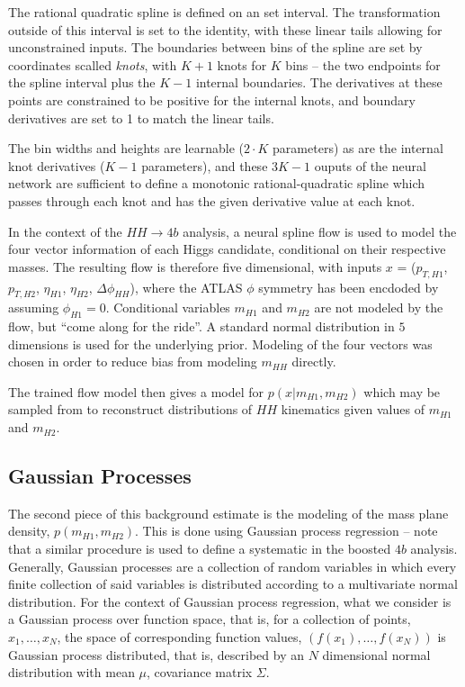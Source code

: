 The rational quadratic spline is defined on an set interval. The transformation outside of this interval 
is set to the identity, with these linear tails allowing for unconstrained inputs. The boundaries between 
bins of the spline are set by coordinates scalled \emph{knots}, with $K+1$ knots for $K$ bins -- the two 
endpoints for the spline interval plus the $K-1$ internal boundaries. The derivatives 
at these points are constrained to be positive for the internal knots, and boundary 
derivatives are set to 1 to match the linear tails. 

The bin widths and heights are learnable ($2\cdot K$ parameters) as are the internal knot derivatives
($K-1$ parameters), and these $3K-1$ ouputs of the neural network are sufficient to define a monotonic 
rational-quadratic spline which passes through each knot and has the given derivative value at each knot.

In the context of the $HH\rightarrow 4b$ analysis, a neural spline flow is used to model the four vector 
information of each Higgs candidate, conditional on their respective masses. The resulting flow is 
therefore five dimensional, with inputs $x$ = ($p_{T, H1}$, $p_{T, H2}$, $\eta_{H1}$, $\eta_{H2}$, 
$\Delta\phi_{HH}$), where the ATLAS $\phi$ symmetry has been encdoded by assuming $\phi_{H1} = 0$. 
Conditional variables $m_{H1}$ and $m_{H2}$ are not modeled by the flow, but ``come along for the ride''. 
A standard normal distribution in $5$ dimensions is used for the underlying prior. Modeling of the four 
vectors was chosen in order to reduce bias from modeling $m_{HH}$ directly.

The trained flow model then gives a model for $p(x|m_{H1}, m_{H2})$ which may be sampled from to reconstruct 
distributions of $HH$ kinematics given values of $m_{H1}$ and $m_{H2}$.

\subsection{Gaussian Processes}
The second piece of this background estimate is the modeling of the mass plane density, $p(m_{H1}, m_{H2})$. 
This is done using Gaussian process regression -- note that a similar procedure is used to define a systematic 
in the boosted $4b$ analysis. Generally, Gaussian processes are a collection of random variables in which every 
finite collection of said variables is distributed according to a multivariate normal distribution. For the 
context of Gaussian process regression, what we consider is a Gaussian process over function space, that is, 
for a collection of points, $x_{1}, \ldots, x_{N}$, the space of corresponding function 
values, $(f(x_{1}), \ldots, f(x_{N}))$ is Gaussian process distributed, that is, described by an $N$ dimensional 
normal distribution with mean $\mu$, covariance matrix $\Sigma$.

